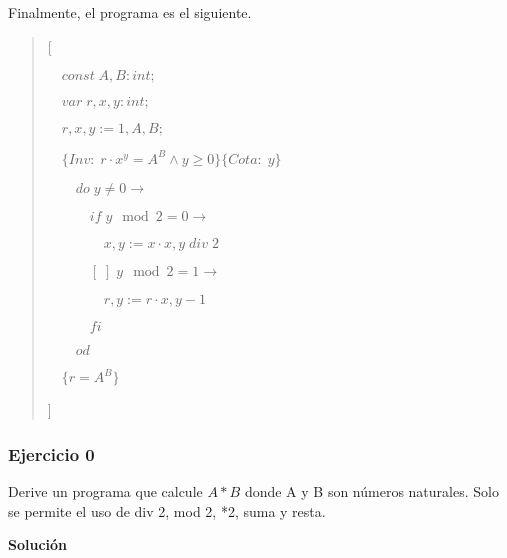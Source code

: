 \documentclass[hidelinks]{article}
\newenvironment{absolutelynopagebreak}
{\Needspace{10\baselineskip}\begin{quote}}
		{\end{quote}}
\begin{document}
\begin{enumerate}
	      Finalmente, el programa es el siguiente.\par

	      \begin{absolutelynopagebreak}
		      [\par
			      $\quad const \; A, B: int;$\par
			      $\quad var \; r, x, y : int;$\par
			      $\quad r, x, y := 1, A, B;$\par
			      $\quad \{Inv:\; r \cdot x^y = A^B \land y \geq 0\}\{Cota: \; y\}$ \par
			      $\qquad do \; y \neq 0 \rightarrow$ \par
			      $\qquad \quad if \; y \mod 2 = 0 \rightarrow$ \par
			      $\qquad \quad \quad x, y := x \cdot x, y \; div \; 2$ \par
			      $\qquad \quad [\;] \; y \mod 2 = 1 \rightarrow$ \par
			      $\qquad \quad \quad r, y := r \cdot x, y - 1$ \par
			      $\qquad \quad fi$ \par
			      $\qquad od$ \par
			      $\quad \{r =A^B\}$ \par
		      ]\par
	      \end{absolutelynopagebreak}\par

\end{enumerate}

\newpage

\subsubsection{Ejercicio 0}

Derive un programa que calcule $A * B$ donde A y B son números naturales. Solo
se permite el uso de div 2, mod 2, *2, suma y resta.\par

\textbf{Solución}\par
\end{document}
